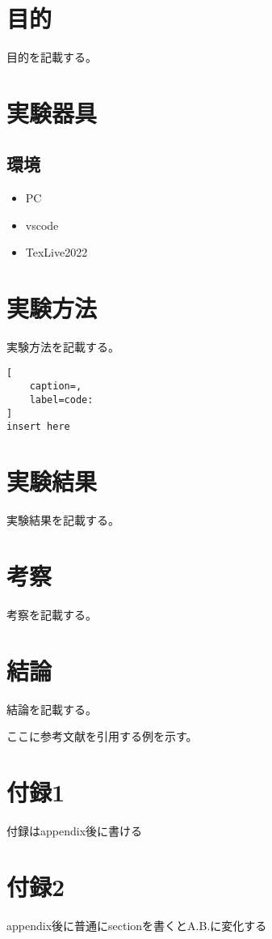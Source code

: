 \documentclass[titlepage]{jlreq}
\begin{document}
\section{目的}

目的を記載する。

\section{実験器具}

\subsection{環境}

\begin{itemize}
    \item PC
    \item vscode
    \item TexLive2022
  \end{itemize}

\section{実験方法}

実験方法を記載する。

\begin{lstlisting}[
    caption=,
    label=code:
]
insert here
\end{lstlisting}

\section{実験結果}

実験結果を記載する。

\section{考察}

考察を記載する。


\section{結論}

結論を記載する。

ここに参考文献を引用する例を示す。

\cite{hon2}

\cite{hon1-a}

\cite{hon1-b}

\cite{webpage1}

\cite{handbook}







\appendix

\section{付録1}

付録はappendix後に書ける

\section{付録2}

appendix後に普通にsectionを書くとA.B.に変化する
\end{document}
